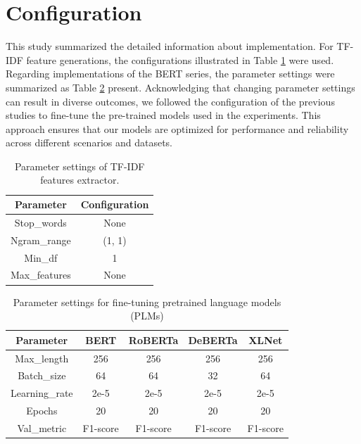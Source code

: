 \section{Configuration}
This study summarized the detailed information about implementation. For TF-IDF feature generations, the configurations illustrated in Table \ref{tab:TFIDF_detail} were used. Regarding implementations of the BERT series, the parameter settings were summarized as Table \ref{tab:BERT_detail} present. Acknowledging that changing parameter settings can result in diverse outcomes, we followed the configuration of the previous studies\cite{b5,b31,b33} to fine-tune the pre-trained models used in the experiments. This approach ensures that our models are optimized for performance and reliability across different scenarios and datasets.

\begin{table}
    \centering
    \caption{Parameter settings of TF-IDF features extractor.}
    \label{tab:TFIDF_detail}
\begin{tabular}{|c|c|}
\hline
Parameter     & Configuration \\ \hline
Stop\_words   & None          \\
Ngram\_range  & (1, 1)        \\
Min\_df       & 1             \\
Max\_features & None          \\ \hline
\end{tabular}
\end{table}


\begin{table}
    \centering
    \caption{Parameter settings for fine-tuning pretrained language models (PLMs)}
    \label{tab:BERT_detail}
\begin{tabular}{|c|cccc|}
\hline
Parameter      & BERT     & RoBERTa  & DeBERTa  & XLNet    \\ \hline
Max\_length    & 256      & 256      & 256      & 256      \\
Batch\_size    & 64       & 64       & 32       & 64       \\
Learning\_rate & 2e-5     & 2e-5     & 2e-5     & 2e-5     \\
Epochs         & 20       & 20       & 20       & 20       \\
Val\_metric    & F1-score & F1-score & F1-score & F1-score \\ \hline
\end{tabular}
\end{table}

